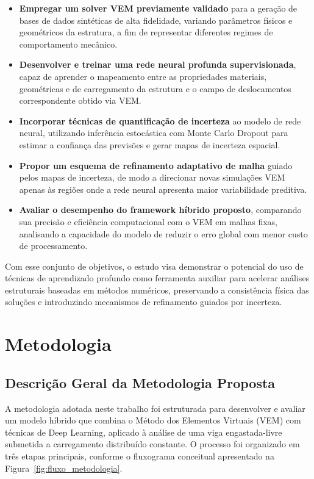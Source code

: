 \documentclass[12pt,openright,oneside,a4paper,english,brazil]{abntex2}
\begin{document}
\begin{itemize}
    \item \textbf{Empregar um solver VEM previamente validado} para a geração de bases de dados sintéticas de alta fidelidade, variando parâmetros físicos e geométricos da estrutura, a fim de representar diferentes regimes de comportamento mecânico.
    \item \textbf{Desenvolver e treinar uma rede neural profunda supervisionada}, capaz de aprender o mapeamento entre as propriedades materiais, geométricas e de carregamento da estrutura e o campo de deslocamentos correspondente obtido via VEM.
    \item \textbf{Incorporar técnicas de quantificação de incerteza} ao modelo de rede neural, utilizando inferência estocástica com Monte Carlo Dropout para estimar a confiança das previsões e gerar mapas de incerteza espacial.
    \item \textbf{Propor um esquema de refinamento adaptativo de malha} guiado pelos mapas de incerteza, de modo a direcionar novas simulações VEM apenas às regiões onde a rede neural apresenta maior variabilidade preditiva.
    \item \textbf{Avaliar o desempenho do framework híbrido proposto}, comparando sua precisão e eficiência computacional com o VEM em malhas fixas, analisando a capacidade do modelo de reduzir o erro global com menor custo de processamento.
\end{itemize}

Com esse conjunto de objetivos, o estudo visa demonstrar o potencial do uso de técnicas de aprendizado profundo como ferramenta auxiliar para acelerar análises estruturais baseadas em métodos numéricos, preservando a consistência física das soluções e introduzindo mecanismos de refinamento guiados por incerteza.

\chapter{Metodologia}

\section{Descrição Geral da Metodologia Proposta}

A metodologia adotada neste trabalho foi estruturada para desenvolver e avaliar um modelo híbrido que combina o Método dos Elementos Virtuais (VEM) com técnicas de Deep Learning, aplicado 
à análise de uma viga engastada-livre submetida a carregamento distribuído constante. O processo foi organizado em três etapas principais, conforme o fluxograma conceitual apresentado na 
Figura~\ref{fig:fluxo_metodologia}.
\end{document}
